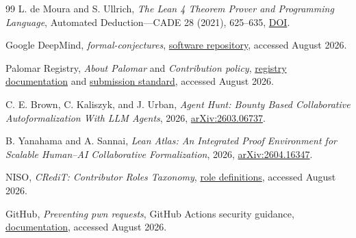 \documentclass[10pt]{article}
\begin{document}
\begin{thebibliography}{99}
L. de Moura and S. Ullrich, \emph{The Lean 4 Theorem Prover and Programming
Language}, Automated Deduction---CADE 28 (2021), 625--635,
\href{https://doi.org/10.1007/978-3-030-79876-5_37}{DOI}.

Google DeepMind, \emph{formal-conjectures},
\href{https://github.com/google-deepmind/formal-conjectures}{software repository},
accessed August 2026.

Palomar Registry, \emph{About Palomar} and \emph{Contribution policy},
\href{https://palomar-registry.org/about}{registry documentation} and
\href{https://github.com/PalomarRegistry/PalomarPolicy/blob/main/CONTRIBUTING.md}{submission standard},
accessed August 2026.

C. E. Brown, C. Kaliszyk, and J. Urban, \emph{Agent Hunt: Bounty Based
Collaborative Autoformalization With LLM Agents}, 2026,
\href{https://arxiv.org/abs/2603.06737}{arXiv:2603.06737}.

B. Yanahama and A. Sannai, \emph{Lean Atlas: An Integrated Proof Environment
for Scalable Human--AI Collaborative Formalization}, 2026,
\href{https://arxiv.org/abs/2604.16347}{arXiv:2604.16347}.

NISO, \emph{CRediT: Contributor Roles Taxonomy},
\href{https://credit.niso.org/contributor-roles-defined/}{role definitions},
accessed August 2026.

GitHub, \emph{Preventing pwn requests}, GitHub Actions security guidance,
\href{https://docs.github.com/en/actions/reference/security/secure-use}{documentation},
accessed August 2026.

\end{thebibliography}
\end{document}
